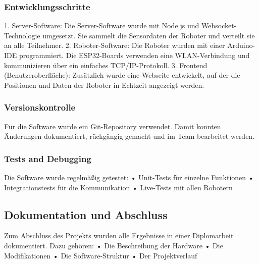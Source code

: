 \subsubsection{Entwicklungsschritte}
1.	Server-Software:
Die Server-Software wurde mit Node.js und Websocket-Technologie umgesetzt. Sie sammelt die Sensordaten der Roboter und verteilt sie an alle Teilnehmer.
2.	Roboter-Software:
Die Roboter wurden mit einer Arduino-IDE programmiert. Die ESP32-Boards verwenden eine WLAN-Verbindung und kommunizieren über ein einfaches TCP/IP-Protokoll.
3.	Frontend (Benutzeroberfläche):
Zusätzlich wurde eine Webseite entwickelt, auf der die Positionen und Daten der Roboter in Echtzeit angezeigt werden.
\subsubsection{Versionskontrolle}
Für die Software wurde ein Git-Repository verwendet. Damit konnten Änderungen dokumentiert, rückgängig gemacht und im Team bearbeitet werden.
\subsubsection{Tests and Debugging}
Die Software wurde regelmäßig getestet:
•	Unit-Tests für einzelne Funktionen
•	Integrationstests für die Kommunikation
•	Live-Tests mit allen Robotern
\subsection{Dokumentation und Abschluss}
Zum Abschluss des Projekts wurden alle Ergebnisse in einer Diplomarbeit dokumentiert.
Dazu gehören:
•	Die Beschreibung der Hardware
•	Die Modifikationen
•	Die Software-Struktur
•	Der Projektverlauf
